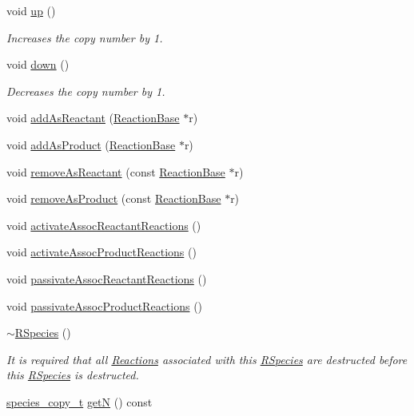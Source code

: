 \begin{DoxyCompactItemize}
void \hyperlink{classRSpecies_a6ded5d8dc0ccfcb0a45418a6c33a5595}{up} ()
\begin{DoxyCompactList}\small\item\em Increases the copy number by 1. \end{DoxyCompactList}\item 
void \hyperlink{classRSpecies_a7171743315bf9687feb639f13cea4ef5}{down} ()
\begin{DoxyCompactList}\small\item\em Decreases the copy number by 1. \end{DoxyCompactList}\item 
void \hyperlink{classRSpecies_a6e52bc2409c55b706197b2e48323aff2}{add\+As\+Reactant} (\hyperlink{classReactionBase}{Reaction\+Base} $\ast$r)
\item 
void \hyperlink{classRSpecies_aa3e5bfc99f8e3a403051839f717ff775}{add\+As\+Product} (\hyperlink{classReactionBase}{Reaction\+Base} $\ast$r)
\item 
void \hyperlink{classRSpecies_a3abaae1f77fc3cd47eb77926b7f26828}{remove\+As\+Reactant} (const \hyperlink{classReactionBase}{Reaction\+Base} $\ast$r)
\item 
void \hyperlink{classRSpecies_abafe985e54f2ca717e3d093217864bd4}{remove\+As\+Product} (const \hyperlink{classReactionBase}{Reaction\+Base} $\ast$r)
\item 
void \hyperlink{classRSpecies_a8e5442de08d5f11166cf153f96062e99}{activate\+Assoc\+Reactant\+Reactions} ()
\item 
void \hyperlink{classRSpecies_ae3b2bf2d19b7b27dff79dd3fbd6be66b}{activate\+Assoc\+Product\+Reactions} ()
\item 
void \hyperlink{classRSpecies_a4cecb0924ec9576ffb9006878739b3d9}{passivate\+Assoc\+Reactant\+Reactions} ()
\item 
void \hyperlink{classRSpecies_ad283410f170a8f90805ddfcf2e11bef8}{passivate\+Assoc\+Product\+Reactions} ()
\item 
\hyperlink{classRSpecies_accd8e595b1e16dc81990043ea56e90bd}{$\sim$\+R\+Species} ()
\begin{DoxyCompactList}\small\item\em It is required that all \hyperlink{classReaction}{Reactions} associated with this \hyperlink{classRSpecies}{R\+Species} are destructed before this \hyperlink{classRSpecies}{R\+Species} is destructed. \end{DoxyCompactList}\item 
\hyperlink{common_8h_a3503f321fd36304ee274141275cca586}{species\+\_\+copy\+\_\+t} \hyperlink{classRSpecies_ab9b95848fbc0ceffbe0d1ca0153ebde7}{get\+N} () const 

\end{DoxyCompactItemize}
